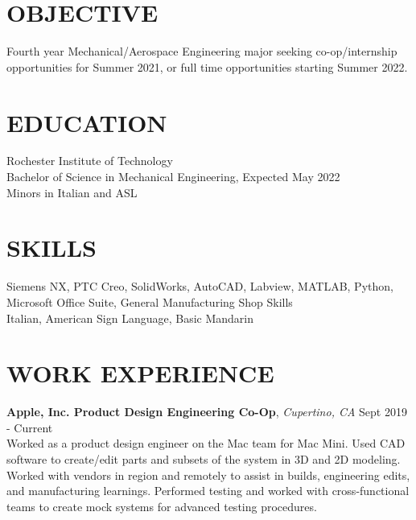 \documentclass[line, resmargin]{res}
\begin{document}
\address{(717) 819-5384\\ mxw3196@rit.edu}

\small
\begin{resume}
\vspace{-7mm} %

\section{OBJECTIVE}
Fourth year Mechanical/Aerospace Engineering major seeking co-op/internship opportunities for Summer 2021, or full time opportunities starting Summer 2022.

\vspace{-2.5mm}

\section{EDUCATION} 
 Rochester Institute of Technology \\
 Bachelor of Science in Mechanical Engineering, Expected May 2022\\
 Minors in Italian and ASL
 
 \vspace{-2.5mm}
 
\section{SKILLS}
 Siemens NX, PTC Creo, SolidWorks, AutoCAD, Labview, MATLAB, Python, Microsoft Office Suite, General Manufacturing Shop Skills\\
 Italian, American Sign Language, Basic Mandarin
 
 \vspace{-2.5mm}
 
\section{WORK EXPERIENCE} 
\textbf{Apple, Inc. Product Design Engineering Co-Op}, \textit{Cupertino, CA} \hfill Sept 2019 - Current \\
Worked as a product design engineer on the Mac team for Mac Mini. Used CAD software to create/edit parts and subsets of the system in 3D and 2D modeling. Worked with vendors in region and remotely to assist in builds, engineering edits, and manufacturing learnings. Performed testing and worked with cross-functional teams to create mock systems for advanced testing procedures.  \\ 


\end{resume}
\end{document}
